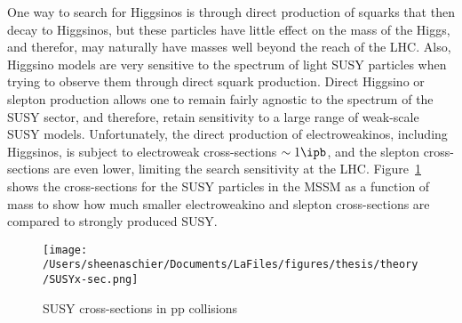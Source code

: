 One way to search for Higgsinos is through direct production of squarks that then decay to Higgsinos, but these particles have little effect on the mass of the Higgs, and therefor, may naturally have masses well beyond the reach of the LHC.  Also, Higgsino models are very sensitive to the spectrum of light SUSY particles when trying to observe them through direct squark production.  Direct Higgsino or slepton production allows one to remain fairly agnostic to the spectrum of the SUSY sector, and therefore, retain sensitivity to a large range of weak-scale SUSY models.  Unfortunately, the direct production of electroweakinos, including Higgsinos, is subject to electroweak cross-sections $\sim 1\ipb$, and the slepton cross-sections are even lower, limiting the search sensitivity at the LHC.  Figure~\ref{fig:thy:xsec} shows the cross-sections for the SUSY particles in the MSSM as a function of mass to show how much smaller electroweakino and slepton cross-sections are compared to strongly produced SUSY.

     \begin{figure}%
  \begin{center}
  \texttt{[image: /Users/sheenaschier/Documents/LaFiles/figures/thesis/theory/SUSYx-sec.png]}
   \end{center}
 \caption{SUSY cross-sections in pp collisions~\cite{Bechtle:2015nta}}
 \label{fig:thy:xsec}
 \end{figure}

